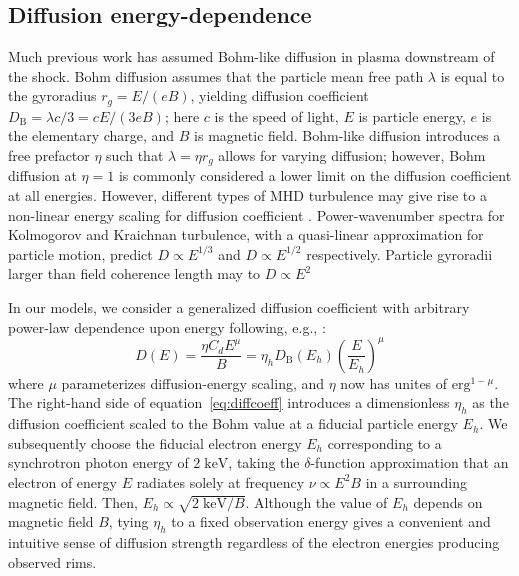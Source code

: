 \documentclass[iop, apj, numberedappendix, twocolappendix]{emulateapj}
\newcommand*{\mt}{\mathrm}
\newcommand*{\unit}[1]{\;\mt{#1}}  %
\begin{document}
\subsection{Diffusion energy-dependence} \label{sec:diffcoeff}

Much previous work has assumed Bohm-like diffusion in plasma downstream of the
shock.  Bohm diffusion assumes that the particle mean free path $\lambda$ is
equal to the gyroradius $r_g = E/(eB)$, yielding diffusion coefficient
$D_{\mt{B}} = \lambda c / 3 = c E / (3 e B)$; here $c$ is the speed of light,
$E$ is particle energy, $e$ is the elementary charge, and $B$ is magnetic
field.  Bohm-like diffusion introduces a free prefactor $\eta$ such that
$\lambda = \eta r_g$ allows for varying diffusion; however, Bohm diffusion at
$\eta = 1$ is commonly considered a lower limit on the diffusion coefficient at
all energies.
However, different types of MHD turbulence may give rise to a non-linear energy
scaling for diffusion coefficient \citep{giacalone1999, reynolds2004}.
Power-wavenumber spectra for Kolmogorov and Kraichnan turbulence, with a
quasi-linear approximation for particle motion,
predict $D \propto E^{1/3}$ and $D \propto E^{1/2}$ respectively.
Particle gyroradii larger than field coherence length may to $D \propto E^{2}$

In our models, we consider a generalized diffusion coefficient with arbitrary
power-law dependence upon energy following, e.g., \citet{parizot2006}:
\begin{equation} \label{eq:diffcoeff}
    D(E) = \frac{\eta C_d E^\mu}{B}
         = \eta_h D_{\mt{B}}\left(E_h\right) \left(\frac{E}{E_h}\right)^\mu
\end{equation}
where $\mu$ parameterizes diffusion-energy scaling, and $\eta$ now has unites
of $\mathrm{erg}^{1-\mu}$.
The right-hand side of equation~\eqref{eq:diffcoeff} introduces a dimensionless
$\eta_h$ as the diffusion coefficient scaled to the Bohm value at a fiducial
particle energy $E_h$.  We subsequently choose the fiducial electron energy
$E_h$ corresponding to a synchrotron photon energy of $2 \unit{keV}$, taking
the $\delta$-function approximation that an electron of energy $E$ radiates
solely at frequency $\nu \propto E^2 B$ in a surrounding magnetic field.  Then,
$E_h \propto \sqrt{2 \unit{keV} / B}$.  Although the value of $E_h$ depends on
magnetic field $B$, tying $\eta_h$ to a fixed observation energy gives a
convenient and intuitive sense of diffusion strength regardless of the
electron energies producing observed rims.
\end{document}
